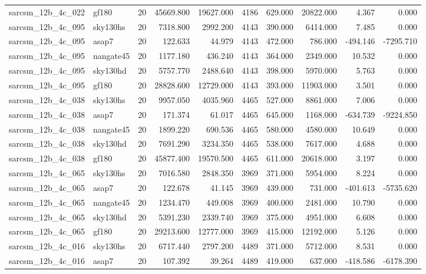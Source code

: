 \begin{tabular}{llrrrrrrrr}
sarcsm\_12b\_4c\_022 & gf180 & 20 & 45669.800 & 19627.000 & 4186 & 629.000 & 20822.000 & 4.367 & 0.000 \\
sarcsm\_12b\_4c\_095 & sky130hs & 20 & 7318.800 & 2992.200 & 4143 & 390.000 & 6414.000 & 7.485 & 0.000 \\
sarcsm\_12b\_4c\_095 & asap7 & 20 & 122.633 & 44.979 & 4143 & 472.000 & 786.000 & -494.146 & -7295.710 \\
sarcsm\_12b\_4c\_095 & nangate45 & 20 & 1177.180 & 436.240 & 4143 & 364.000 & 2349.000 & 10.532 & 0.000 \\
sarcsm\_12b\_4c\_095 & sky130hd & 20 & 5757.770 & 2488.640 & 4143 & 398.000 & 5970.000 & 5.763 & 0.000 \\
sarcsm\_12b\_4c\_095 & gf180 & 20 & 28828.600 & 12729.000 & 4143 & 393.000 & 11903.000 & 3.501 & 0.000 \\
sarcsm\_12b\_4c\_038 & sky130hs & 20 & 9957.050 & 4035.960 & 4465 & 527.000 & 8861.000 & 7.006 & 0.000 \\
sarcsm\_12b\_4c\_038 & asap7 & 20 & 171.374 & 61.017 & 4465 & 645.000 & 1168.000 & -634.739 & -9224.850 \\
sarcsm\_12b\_4c\_038 & nangate45 & 20 & 1899.220 & 690.536 & 4465 & 580.000 & 4580.000 & 10.649 & 0.000 \\
sarcsm\_12b\_4c\_038 & sky130hd & 20 & 7691.290 & 3234.350 & 4465 & 538.000 & 7617.000 & 4.688 & 0.000 \\
sarcsm\_12b\_4c\_038 & gf180 & 20 & 45877.400 & 19570.500 & 4465 & 611.000 & 20618.000 & 3.197 & 0.000 \\
sarcsm\_12b\_4c\_065 & sky130hs & 20 & 7016.580 & 2848.350 & 3969 & 371.000 & 5954.000 & 8.224 & 0.000 \\
sarcsm\_12b\_4c\_065 & asap7 & 20 & 122.678 & 41.145 & 3969 & 439.000 & 731.000 & -401.613 & -5735.620 \\
sarcsm\_12b\_4c\_065 & nangate45 & 20 & 1234.470 & 449.008 & 3969 & 400.000 & 2481.000 & 10.790 & 0.000 \\
sarcsm\_12b\_4c\_065 & sky130hd & 20 & 5391.230 & 2339.740 & 3969 & 375.000 & 4951.000 & 6.608 & 0.000 \\
sarcsm\_12b\_4c\_065 & gf180 & 20 & 29213.600 & 12777.000 & 3969 & 415.000 & 12192.000 & 5.126 & 0.000 \\
sarcsm\_12b\_4c\_016 & sky130hs & 20 & 6717.440 & 2797.200 & 4489 & 371.000 & 5712.000 & 8.531 & 0.000 \\
sarcsm\_12b\_4c\_016 & asap7 & 20 & 107.392 & 39.264 & 4489 & 419.000 & 637.000 & -418.586 & -6178.390 \\

\end{tabular}

